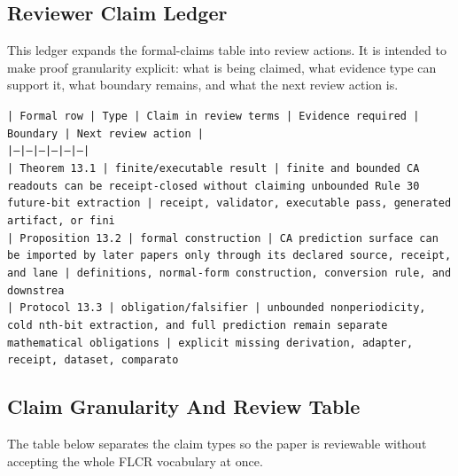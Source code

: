 \documentclass[11pt]{article}
\begin{document}
\subsection*{Reviewer Claim Ledger}

This ledger expands the formal-claims table into review actions. It is intended to make proof granularity explicit: what is being claimed, what evidence type can support it, what boundary remains, and what the next review action is.

\noindent\texttt{| Formal row | Type | Claim in review terms | Evidence required | Boundary | Next review action |}\\
\noindent\texttt{|---|---|---|---|---|---|}\\
\noindent\texttt{| Theorem 13.1 | finite/executable result | finite and bounded CA readouts can be receipt-closed without claiming unbounded Rule 30 future-bit extraction | receipt, validator, executable pass, generated artifact, or fini}\\
\noindent\texttt{| Proposition 13.2 | formal construction | CA prediction surface can be imported by later papers only through its declared source, receipt, and lane | definitions, normal-form construction, conversion rule, and downstrea}\\
\noindent\texttt{| Protocol 13.3 | obligation/falsifier | unbounded nonperiodicity, cold nth-bit extraction, and full prediction remain separate mathematical obligations | explicit missing derivation, adapter, receipt, dataset, comparato}\\

\subsection*{Claim Granularity And Review Table}

The table below separates the claim types so the paper is reviewable without accepting the whole FLCR vocabulary at once.
\end{document}
